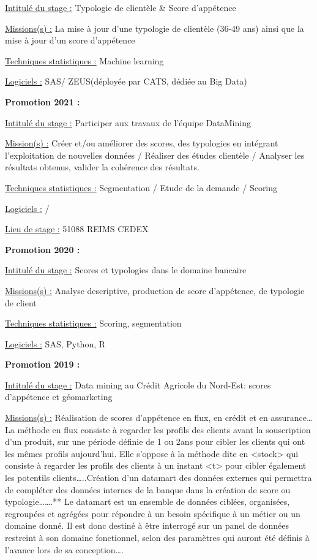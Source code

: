 \documentclass[
  letterpaper,
  DIV=11,
  numbers=noendperiod]{scrreprt}
\begin{document}
\uline{Intitulé du stage :} Typologie de clientèle \& Score d'appétence

\uline{Missions(s) :} La mise à jour d'une typologie de clientèle (36-49
ans) ainsi que la mise à jour d'un score d'appétence

\uline{Techniques statistiques :} Machine learning

\uline{Logiciels :} SAS/ ZEUS(déployée par CATS, dédiée au Big Data)

\textbf{Promotion 2021 :}

\uline{Intitulé du stage :} Participer aux travaux de l'équipe
DataMining

\uline{Mission(s) :} Créer et/ou améliorer des scores, des typologies en
intégrant l'exploitation de nouvelles données / Réaliser des études
clientèle / Analyser les résultats obtenus, valider la cohérence des
résultats.

\uline{Techniques statistiques :} Segmentation / Etude de la demande /
Scoring

\uline{Logiciels :} /

\uline{Lieu de stage :} 51088 REIMS CEDEX

\textbf{Promotion 2020 :}

\uline{Intitulé du stage :} Scores et typologies dans le domaine
bancaire

\uline{Missions(s) :} Analyse descriptive, production de score
d'appétence, de typologie de client

\uline{Techniques statistiques :} Scoring, segmentation

\uline{Logiciels :} SAS, Python, R

\textbf{Promotion 2019 :}

\uline{Intitulé du stage :} Data mining au Crédit Agricole du Nord-Est:
scores d'appétence et géomarketing

\uline{Missions(s) :} Réalisation de scores d'appétence en flux, en
crédit et en assurance\ldots{} La méthode en flux consiste à regarder
les profils des clients avant la souscription d'un produit, sur une
période définie de 1 ou 2ans pour cibler les clients qui ont les mêmes
profils aujourd'hui. Elle s'oppose à la méthode dite en
\textless stock\textgreater{} qui consiste à regarder les profils des
clients à un instant \textless t\textgreater{} pour cibler également les
potentils clients\ldots..Création d'un datamart des données externes qui
permettra de compléter des données internes de la banque dans la
création de score ou typologie\ldots\ldots.** Le datamart est un
ensemble de données ciblées, organisées, regroupées et agrégées pour
répondre à un besoin spécifique à un métier ou un domaine donné. Il est
donc destiné à être interrogé sur un panel de données restreint à son
domaine fonctionnel, selon des paramètres qui auront été définis à
l'avance lors de sa conception\ldots.
\end{document}
